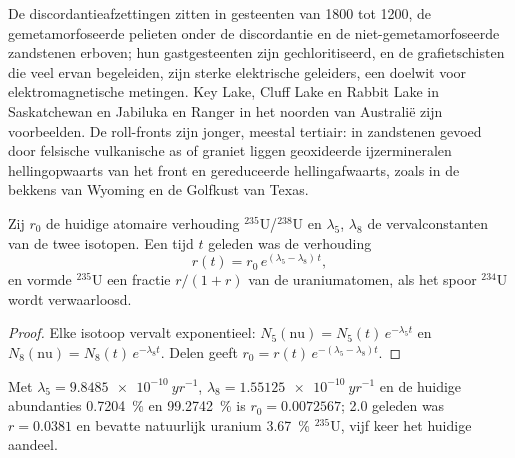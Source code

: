 De discordantieafzettingen zitten in gesteenten van 1800 tot \qty{1200}{\Ma}, de gemetamorfoseerde
pelieten onder de discordantie en de niet-gemetamorfoseerde zandstenen erboven; hun gastgesteenten zijn gechloritiseerd, en de grafietschisten die
veel ervan begeleiden, zijn sterke elektrische geleiders, een doelwit voor elektromagnetische metingen. Key
Lake, Cluff Lake en Rabbit Lake in Saskatchewan en Jabiluka en Ranger in het noorden van Australië zijn
voorbeelden. De roll-fronts zijn jonger, meestal tertiair: in zandstenen gevoed door felsische vulkanische as of
graniet liggen geoxideerde ijzermineralen hellingopwaarts van het front en gereduceerde hellingafwaarts, zoals in de bekkens
van Wyoming en de Golfkust van Texas.

\begin{proposition}\label{prop:b2:energy-geology:u235}
Zij $r_0$ de huidige atomaire verhouding $^{235}$U/$^{238}$U en $\lambda_5$, $\lambda_8$ de
vervalconstanten van de twee isotopen. Een tijd $t$ geleden was de verhouding
\begin{equation}
r(t) = r_0\,e^{(\lambda_5 - \lambda_8)\,t} ,
\label{eq:b2:energy-geology:u235}
\end{equation}
en vormde $^{235}$U een fractie $r/(1 + r)$ van de uraniumatomen, als het spoor
$^{234}$U wordt verwaarloosd.
\end{proposition}

\begin{proof}
Elke isotoop vervalt exponentieel: $N_5(\text{nu}) = N_5(t)\,e^{-\lambda_5 t}$ en $N_8(\text{nu})
= N_8(t)\,e^{-\lambda_8 t}$. Delen geeft $r_0 = r(t)\,e^{-(\lambda_5 - \lambda_8)t}$.
\end{proof}

Met $\lambda_5 = \qty{9.8485e-10}{yr^{-1}}$, $\lambda_8 = \qty{1.55125e-10}{yr^{-1}}$ en de huidige
abundanties \qty{0.7204}{\percent} en \qty{99.2742}{\percent} is $r_0 = 0.0072567$; \qty{2.0}{\Ga}
geleden was $r = 0.0381$ en bevatte natuurlijk uranium \qty{3.67}{\percent} $^{235}$U, vijf keer het huidige
aandeel.

